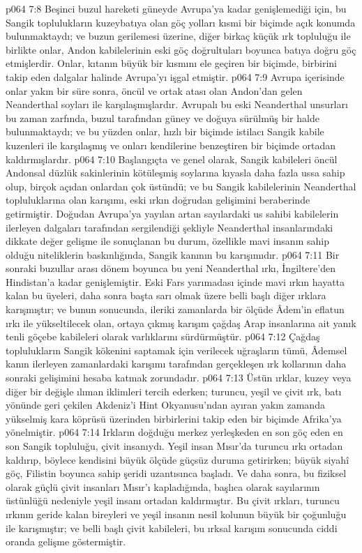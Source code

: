 \vs p064 7:8 Beşinci buzul hareketi güneyde Avrupa’ya kadar genişlemediği için, bu Sangik toplulukların kuzeybatıya olan göç yolları kısmi bir biçimde açık konumda bulunmaktaydı; ve buzun gerilemesi üzerine, diğer birkaç küçük ırk topluluğu ile birlikte onlar, Andon kabilelerinin eski göç doğrultuları boyunca batıya doğru göç etmişlerdir. Onlar, kıtanın büyük bir kısmını ele geçiren bir biçimde, birbirini takip eden dalgalar halinde Avrupa’yı işgal etmiştir.
\vs p064 7:9 Avrupa içerisinde onlar yakın bir süre sonra, öncül ve ortak atası olan Andon’dan gelen Neanderthal soyları ile karşılaşmışlardır. Avrupalı bu eski Neanderthal unsurları bu zaman zarfında, buzul tarafından güney ve doğuya sürülmüş bir halde bulunmaktaydı; ve bu yüzden onlar, hızlı bir biçimde istilacı Sangik kabile kuzenleri ile karşılaşmış ve onları kendilerine benzeştiren bir biçimde ortadan kaldırmışlardır.
\vs p064 7:10 Başlangıçta ve genel olarak, Sangik kabileleri öncül Andonsal düzlük sakinlerinin kötüleşmiş soylarına kıyasla daha fazla ussa sahip olup, birçok açıdan onlardan çok üstündü; ve bu Sangik kabilelerinin Neanderthal topluluklarına olan karışımı, eski ırkın doğrudan gelişimini beraberinde getirmiştir. Doğudan Avrupa’ya yayılan artan sayılardaki us sahibi kabilelerin ilerleyen dalgaları tarafından sergilendiği şekliyle Neanderthal insanlarındaki dikkate değer gelişme ile sonuçlanan bu durum, özellikle mavi insanın sahip olduğu niteliklerin baskınlığında, Sangik kanının bu karışımıdır.
\vs p064 7:11 Bir sonraki buzullar arası dönem boyunca bu yeni Neanderthal ırkı, İngiltere’den Hindistan’a kadar genişlemiştir. Eski Fars yarımadası içinde mavi ırkın hayatta kalan bu üyeleri, daha sonra başta sarı olmak üzere belli başlı diğer ırklara karışmıştır; ve bunun sonucunda, ileriki zamanlarda bir ölçüde Âdem’in eflatun ırkı ile yükseltilecek olan, ortaya çıkmış karışım çağdaş Arap insanlarına ait yanık tenli göçebe kabileleri olarak varlıklarını sürdürmüştür.
\vs p064 7:12 Çağdaş toplulukların Sangik kökenini saptamak için verilecek uğraşların tümü, Âdemsel kanın ilerleyen zamanlardaki karışımı tarafından gerçekleşen ırk kollarının daha sonraki gelişimini hesaba katmak zorundadır.
\vs p064 7:13 Üstün ırklar, kuzey veya diğer bir değişle ılıman iklimleri tercih ederken; turuncu, yeşil ve çivit ırk, batı yönünde geri çekilen Akdeniz’i Hint Okyanusu’ndan ayıran yakın zamanda yükselmiş kara köprüsü üzerinden birbirlerini takip eden bir biçimde Afrika’ya yönelmiştir.
\vs p064 7:14 Irkların doğduğu merkez yerleşkeden en son göç eden en son Sangik topluluğu, çivit insanıydı. Yeşil insan Mısır’da turuncu ırkı ortadan kaldırıp, böylece kendisini büyük ölçüde güçsüz duruma getirirken; büyük siyahî göç, Filistin boyunca sahip şeridi uzantısınca başladı. Ve daha sonra, bu fiziksel olarak güçlü çivit insanları Mısır’ı kapladığında, başlıca olarak sayılarının üstünlüğü nedeniyle yeşil insanı ortadan kaldırmıştır. Bu çivit ırkları, turuncu ırkının geride kalan bireyleri ve yeşil insanın nesil kolunun büyük bir çoğunluğu ile karışmıştır; ve belli başlı çivit kabileleri, bu ırksal karışım sonucunda ciddi oranda gelişme göstermiştir.
